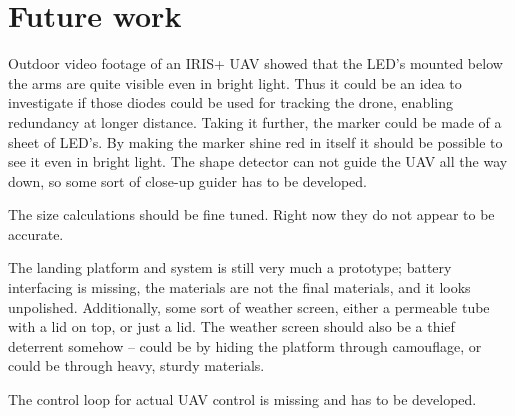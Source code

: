 \section{Future work}
Outdoor video footage of an IRIS+ UAV showed that the LED's mounted below the arms are quite visible even in bright light. Thus it could be an idea to investigate if those diodes could be used for tracking the drone, enabling redundancy at longer distance. Taking it further, the marker could be made of a sheet of LED's. By making the marker shine red in itself it should be possible to see it even in bright light. The shape detector can not guide the UAV all the way down, so some sort of close-up guider has to be developed.

The size calculations should be fine tuned. Right now they do not appear to be accurate. 

The landing platform and system is still very much a prototype; battery interfacing is missing, the materials are not the final materials, and it looks unpolished. Additionally, some sort of weather screen, either a permeable tube with a lid on top, or just a lid. The weather screen should also be a thief deterrent somehow -- could be by hiding the platform through camouflage, or could be through heavy, sturdy materials.

The control loop for actual UAV control is missing and has to be developed.